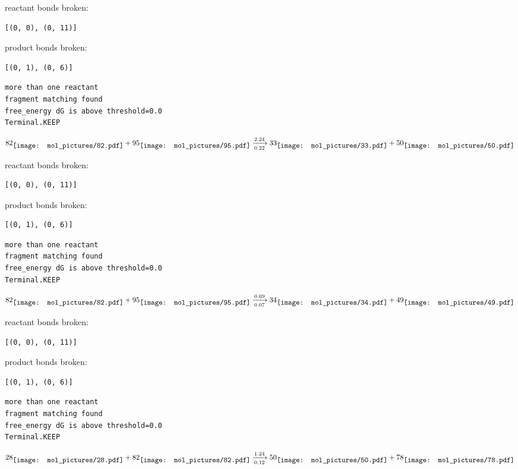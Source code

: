 \documentclass{article}
\begin{document}
reactant bonds broken:\begin{verbatim}
[(0, 0), (0, 11)]
\end{verbatim}
product bonds broken:\begin{verbatim}
[(0, 1), (0, 6)]
\end{verbatim}




\vspace{1cm}
\begin{verbatim}
more than one reactant
fragment matching found
free_energy dG is above threshold=0.0
Terminal.KEEP
\end{verbatim}
$$
82
\raisebox{-.5\height}{\texttt{[image: mol\_pictures/82.pdf]}}
+
95
\raisebox{-.5\height}{\texttt{[image: mol\_pictures/95.pdf]}}
\xrightarrow[0.22]{2.24}
33
\raisebox{-.5\height}{\texttt{[image: mol\_pictures/33.pdf]}}
+
50
\raisebox{-.5\height}{\texttt{[image: mol\_pictures/50.pdf]}}
$$


reactant bonds broken:\begin{verbatim}
[(0, 0), (0, 11)]
\end{verbatim}
product bonds broken:\begin{verbatim}
[(0, 1), (0, 6)]
\end{verbatim}




\vspace{1cm}
\begin{verbatim}
more than one reactant
fragment matching found
free_energy dG is above threshold=0.0
Terminal.KEEP
\end{verbatim}
$$
82
\raisebox{-.5\height}{\texttt{[image: mol\_pictures/82.pdf]}}
+
95
\raisebox{-.5\height}{\texttt{[image: mol\_pictures/95.pdf]}}
\xrightarrow[0.07]{0.69}
34
\raisebox{-.5\height}{\texttt{[image: mol\_pictures/34.pdf]}}
+
49
\raisebox{-.5\height}{\texttt{[image: mol\_pictures/49.pdf]}}
$$


reactant bonds broken:\begin{verbatim}
[(0, 0), (0, 11)]
\end{verbatim}
product bonds broken:\begin{verbatim}
[(0, 1), (0, 6)]
\end{verbatim}




\vspace{1cm}
\begin{verbatim}
more than one reactant
fragment matching found
free_energy dG is above threshold=0.0
Terminal.KEEP
\end{verbatim}
$$
28
\raisebox{-.5\height}{\texttt{[image: mol\_pictures/28.pdf]}}
+
82
\raisebox{-.5\height}{\texttt{[image: mol\_pictures/82.pdf]}}
\xrightarrow[0.12]{1.24}
50
\raisebox{-.5\height}{\texttt{[image: mol\_pictures/50.pdf]}}
+
78
\raisebox{-.5\height}{\texttt{[image: mol\_pictures/78.pdf]}}
$$
\end{document}
